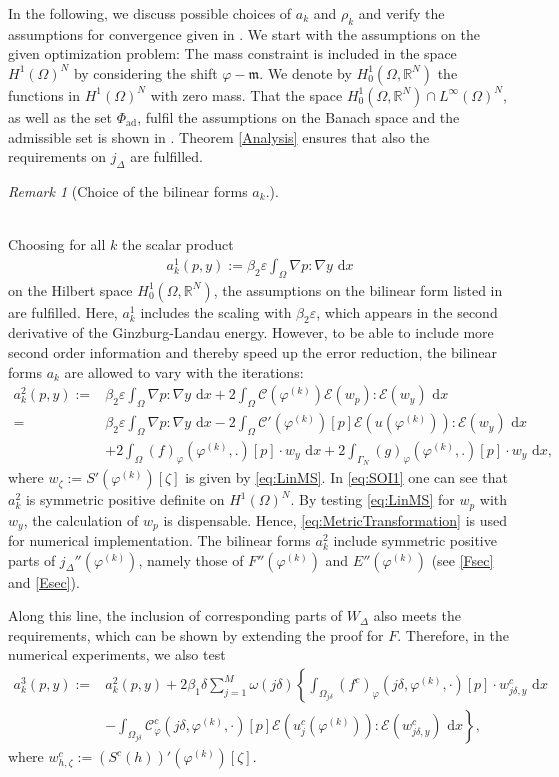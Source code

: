\documentclass[a4paper,11pt]{article}
\theoremstyle{remark}
\newtheorem{remark}{Remark}%
\newcommand{\phik}{\varphi^{(k)}}
\newcommand{\dx}{\text{ d}x}
\newcommand{\intO}{\int_{\Omega}}
\newcommand{\Pad}{\Phi_{\text{ad}}}
\newcommand{\Hzero}{H^1_{0}(\Omega,\mathbb{R}^N)}
\newcommand{\HON}{H^1(\Omega)^N }
\newcommand{\LinfN}{L^\infty(\Omega)^N}
\begin{document}
In the following, we discuss possible choices of $a_k$ and $\rho_k$
and verify the assumptions for convergence given in \cite{VMPT}. We start with the assumptions on the given optimization problem:
The mass constraint is included in the space $\HON $ by considering the shift
$\varphi -\mathfrak{m}$.
We denote by $\Hzero$ the functions in $\HON$ with zero mass.
That the space $\Hzero \cap\LinfN$, as well as the set $\Pad$, fulfil the assumptions on the Banach space and the admissible set is shown in \cite{VMPT}. 
Theorem \ref{Analysis} ensures that also the requirements on $j_\Delta $ are fulfilled.
\newpage
%
\begin{remark}[Choice of the bilinear forms $a_k$.]
\label{choiceAK}
{\rm
\hfill \\
Choosing for all $k$ the scalar product
\begin{align}
a^1_k(p,y):= \beta_2\varepsilon \intO \nabla p:\nabla y \dx
\end{align}
on the Hilbert space $\Hzero$, the assumptions on the bilinear form listed in \cite{VMPT} are fulfilled.
Here, $a^1_k$ includes the scaling with $\beta_2\varepsilon$, which appears in the second derivative of the Ginzburg-Landau energy.
However, to be able to include more second order information and thereby speed up the error reduction, the bilinear forms $a_k$ are allowed to vary with the iterations:
\begin{align}
\label{eq:SOI1} a^2_k(p,y) :=&
\beta_2\varepsilon \intO \nabla p:\nabla y \dx + 2\intO \mathcal{C}(\phik) \mathcal{E}(w_p) : \mathcal{E}(w_y) \dx \\
= &\beta_2\varepsilon \intO \nabla p:\nabla y \dx
- 2\intO \mathcal{C}' (\phik)[p] \mathcal{E}(u(\phik)) : \mathcal{E}(w_y) \dx
\label{eq:MetricTransformation}
\\
&+ 2\intO (f)_\varphi(\phik,.)[p] \cdot w_y \dx
+ 2\int_{\Gamma_N}(g)_\varphi(\phik,.)[p] \cdot w_y \dx
, \nonumber
\end{align}
where $w_\zeta:=S'(\phik)[\zeta]$ is given by \eqref{eq:LinMS}.
In \eqref{eq:SOI1} one can see that
  $a_k^2$ is symmetric positive definite on $\HON$.
  By testing \eqref{eq:LinMS} for $w_p$ with $w_y$, the calculation of $w_p$ is dispensable. Hence,
 \eqref{eq:MetricTransformation} is used for numerical implementation.
The bilinear forms $a^2_k$ include symmetric positive parts of $j_\Delta''(\phik)$, namely those of $F''(\phik)$ and $E''(\phik)$ (see \eqref{Fsec} and \eqref{Esec}).

%
Along this line, the inclusion of corresponding parts of $W_\Delta$ also meets the requirements, which can be shown by extending the proof for $F$. 
Therefore, in the numerical experiments, we also test
\begin{align}
\label{eq:SOI2} a^3_k(p,y) :=& a^2_k(p,y) +
2\beta_1 \delta \sum_{j=1}^M \omega(j\delta)
\left\{
\int_{\Omega_{j\delta}} (f^c)_{\varphi} (j\delta,\phik,\cdot)[p] \cdot w^c_{j\delta,y} \dx \right. \\
&\left. - \int_{\Omega_{j\delta}} \mathcal{C}^c_\varphi(j\delta,\phik,\cdot )[p]\mathcal{E}(u_j^c(\phik )):\mathcal{E}(w^c_{j\delta ,y} ) \dx
\right\}, \nonumber
\end{align}
where $w^c_{h,\zeta} :=(S^c(h))'(\phik)[\zeta]$.

}
\end{remark}
\end{document}
